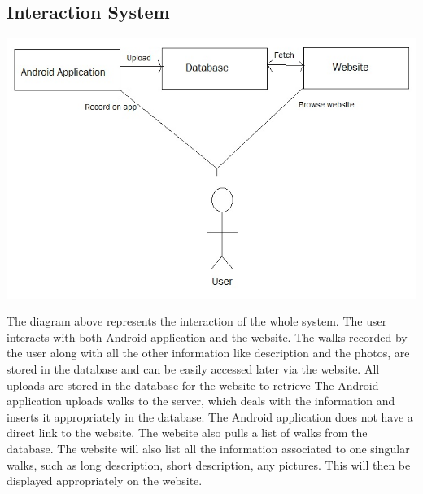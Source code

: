 \documentclass[12pt]{article}
\begin{document}
\subsection{Interaction System}
\includegraphics[scale=0.50]{Project_Plan/docs/system_interaction.jpg}
\par{The diagram above represents the interaction of the whole system. The user interacts with both Android application and the website. The walks recorded by the user along with all the other information like description and the photos, are stored in the database and can be easily accessed later via the website. All uploads are stored in the database for the website to retrieve
The Android application uploads walks to the server, which deals with the information and inserts it appropriately in the database. The Android application does not have a direct link to the website. The website also pulls a list of walks from the database. The website will also list all the information associated to one singular walks, such as long description, short description, any pictures. This will then be displayed appropriately on the website.}
\end{document}
